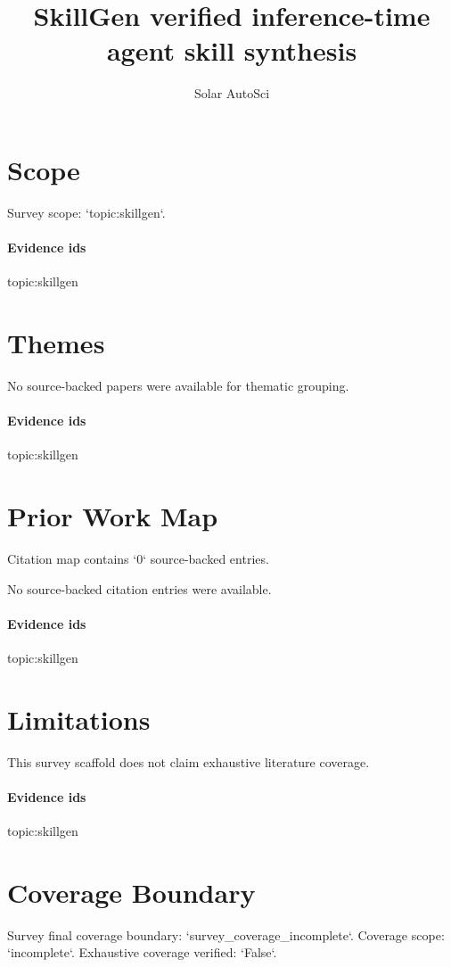 \documentclass{article}
\title{SkillGen verified inference-time agent skill synthesis}
\author{Solar AutoSci}
\date{}
\begin{document}
\maketitle

\section{Scope}
Survey scope: `topic:skillgen`.

\paragraph{Evidence ids} topic:skillgen

\section{Themes}
No source-backed papers were available for thematic grouping.

\paragraph{Evidence ids} topic:skillgen

\section{Prior Work Map}
Citation map contains `0` source-backed entries.

No source-backed citation entries were available.

\paragraph{Evidence ids} topic:skillgen

\section{Limitations}
This survey scaffold does not claim exhaustive literature coverage.

\paragraph{Evidence ids} topic:skillgen

\section{Coverage Boundary}
Survey final coverage boundary: `survey\_coverage\_incomplete`. Coverage scope: `incomplete`. Exhaustive coverage verified: `False`.
\end{document}
